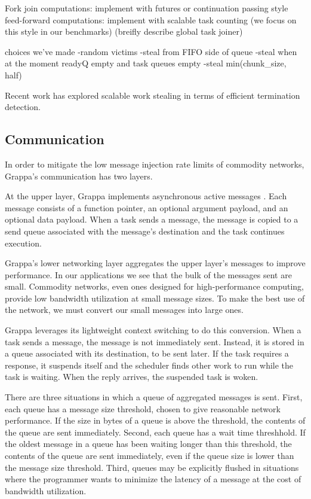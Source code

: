 Fork join computations: implement with futures or continuation passing
style
feed-forward computations: implement with scalable task counting (we
focus on this style in our benchmarks)
(breifly describe global task joiner)

choices we've made
-random victims
-steal from FIFO side of queue
-steal when at the moment readyQ empty and task queues empty
-steal min(chunk\_size, half)

Recent work has explored scalable work stealing in terms of efficient
termination detection. 



\subsection{Communication}

In order to mitigate the low message injection rate limits of commodity
networks, Grappa's communication has two layers. 

At the upper layer, Grappa implements asynchronous active messages
. Each message consists of a function pointer, an
optional argument payload, and an optional data payload. When a task
sends a message, the message is copied to a send queue associated with
the message's destination and the task continues execution.

Grappa's lower networking layer aggregates the upper layer's messages
to improve performance. In our applications we see that the bulk of
the messages sent are small.  Commodity networks,
even ones designed for high-performance computing, provide low
bandwidth utilization at small message sizes.  To
make the best use of the network, we must convert our small messages
into large ones.

Grappa leverages its lightweight context switching to do this
conversion. When a task sends a message, the message is not
immediately sent. Instead, it is stored in a queue associated with its
destination, to be sent later. If the task requires a response, it
suspends itself and the scheduler finds other work to run while the
task is waiting. When the reply arrives, the suspended task is woken.

There are three situations in which a queue of aggregated messages is
sent. First, each queue has a message size threshold, chosen to give
reasonable network performance. If the size in bytes of a queue is
above the threshold, the contents of the queue are sent
immediately. Second, each queue has a wait time threshhold. If the
oldest message in a queue has been waiting longer than this threshold,
the contents of the queue are sent immediately, even if the queue size
is lower than the message size threshold.  Third, queues may be
explicitly flushed in situations where the programmer wants to
minimize the latency of a message at the cost of bandwidth
utilization.

